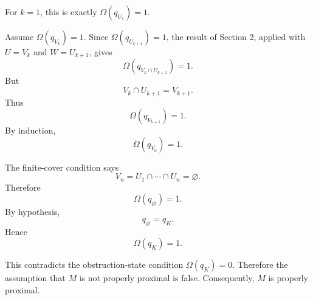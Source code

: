 \documentclass[12pt]{article}
\begin{document}
For \(k=1\), this is exactly \(\Omega(q_{U_1})=1\).

Assume \(\Omega(q_{V_k})=1\). Since \(\Omega(q_{U_{k+1}})=1\), the result of Section 2, applied with \(U=V_k\) and \(W=U_{k+1}\), gives
\[
\Omega(q_{V_k\cap U_{k+1}})=1.
\]
But
\[
V_k\cap U_{k+1}=V_{k+1}.
\]
Thus
\[
\Omega(q_{V_{k+1}})=1.
\]
By induction,
\[
\Omega(q_{V_n})=1.
\]

The finite-cover condition says
\[
V_n=U_1\cap\cdots\cap U_n=\varnothing.
\]
Therefore
\[
\Omega(q_{\varnothing})=1.
\]
By hypothesis,
\[
q_{\varnothing}=q_K.
\]
Hence
\[
\Omega(q_K)=1.
\]

This contradicts the obstruction-state condition \(\Omega(q_K)=0\). Therefore the assumption that \(M\) is not properly proximal is false. Consequently, \(M\) is properly proximal.
\end{document}
